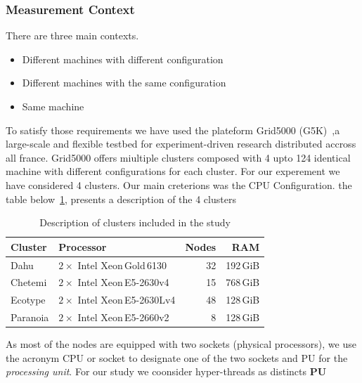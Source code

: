 \subsubsection{Measurement Context}
There are three main contexts.
\begin{itemize}
    \item Different machines with different configuration
    \item Different machines with the same configuration
    \item Same machine
\end{itemize}

To satisfy those requirements we have used the plateform Grid5000 (G5K)~\cite{grid5000,margery:hal-00965708},a large-scale and flexible testbed for experiment-driven research distributed accross all france.
Grid5000 offers  miultiple clusters composed with 4 upto 124 identical machine with different configurations for each cluster.
For our experement we have considered 4 clusters. Our main creterions was the CPU Configuration.
the table below~\ref{table:g5k}, presents a description of the 4 clusters

\begin{table}[!hbt]
    \centering
    \caption{Description of clusters included in the study}
    \label{table:g5k}
    \small
    \begin{tabular}{|l|l|r|r|}
        \hline
        \textbf{Cluster}  & \textbf{Processor}               & \textbf{Nodes} & \textbf{RAM} \\
        \hline
        \hline
        \textsf{Dahu}     & $2\times$ Intel Xeon\,Gold\,6130 & 32             & 192\,GiB     \\
        \hline
        \textsf{Chetemi}  & $2\times$ Intel Xeon\,E5-2630v4  & 15             & 768\,GiB     \\
        \hline
        \textsf{Ecotype}  & $2\times$ Intel Xeon\,E5-2630Lv4 & 48             & 128\,GiB     \\
        \hline
        \textsf{Paranoia} & $2\times$ Intel Xeon\,E5-2660v2  & 8              & 128\,GiB     \\
        \hline
    \end{tabular}
\end{table}

As most of the nodes are equipped with two sockets (physical processors), we use the acronym \textsf{CPU} or \textsf{socket} to designate one of the two sockets and \textsf{PU} for the \emph{processing unit}. For our study we coonsider hyper-threads as distincts \textbf{PU}

